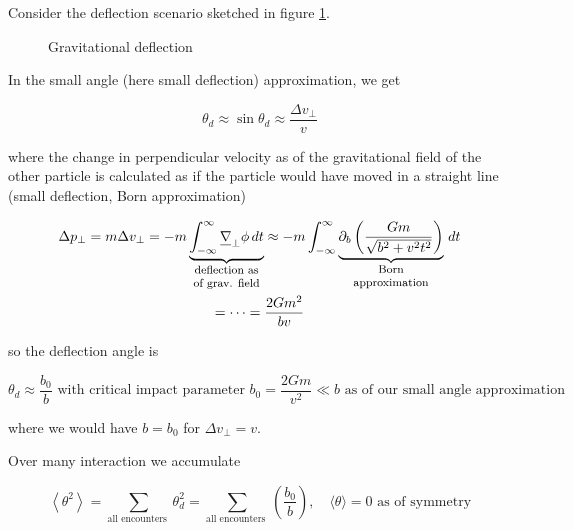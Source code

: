 Consider the deflection scenario sketched in figure \ref{fig:deflection}.

\begin{figure}[H]
    \centering
    
    \caption{Gravitational deflection}
    \label{fig:deflection}
\end{figure}

In the small angle (here small deflection) approximation, we get

\begin{equation}
    \theta_d \approx \sin \theta_d \approx \frac{\Delta v_\perp}{v}
\end{equation}

where the change in perpendicular velocity as of the gravitational field
of the other particle is calculated as if the particle would have moved
in a straight line (small deflection, Born approximation)

\begin{equation}
    \begin{gathered}
        \Delta p_\perp = m \Delta v_\perp = - m \explain{\int_{-\infty}^{\infty} \vec{\nabla}_\perp \phi \, dt}{deflection as of grav. field} \approx - m \int_{-\infty}^{\infty} \explain{\partial_b \left( \frac{Gm}{\sqrt{b^2+v^2 t^2}} \right)}{Born approximation} \, dt \\
        = \dots = \frac{2Gm^2}{bv}
    \end{gathered}
\end{equation}

so the deflection angle is

\begin{equation}
    \theta_d \approx \frac{b_0}{b} \text{ with critical impact parameter } b_0 = \frac{2Gm}{v^2} \ll b \text{ as of our small angle approximation}
\end{equation}

where we would have $b=b_0$ for $\Delta v_\perp = v$.

Over many interaction we accumulate

\begin{equation}
    \left\langle\theta^2\right\rangle=\sum_{\text {all encounters }} \theta_d^2=\sum_{\text {all encounters }}\left(\frac{b_0}{b}\right), \quad \langle \theta \rangle = 0 \text{ as of symmetry}
\end{equation}

